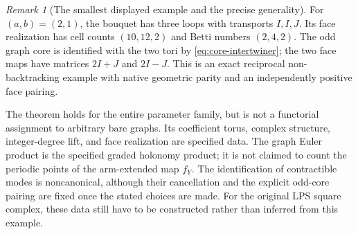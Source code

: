 \documentclass[11pt,a4paper]{article}
\theoremstyle{remark}\newtheorem{remark}[definition]{Remark}
\begin{document}
\begin{remark}[The smallest displayed example and the precise generality]
For $(a,b)=(2,1)$, the bouquet has three loops with transports $I,I,J$. Its face realization has cell counts $(10,12,2)$ and Betti numbers $(2,4,2)$. The odd graph core is identified with the two tori by \eqref{eq:core-intertwiner}; the two face maps have matrices $2I+J$ and $2I-J$. This is an exact reciprocal non-backtracking example with native geometric parity and an independently positive face pairing.

The theorem holds for the entire parameter family, but is not a functorial assignment to arbitrary bare graphs. Its coefficient torus, complex structure, integer-degree lift, and face realization are specified data. The graph Euler product is the specified graded holonomy product; it is not claimed to count the periodic points of the arm-extended map $f_Y$. The identification of contractible modes is noncanonical, although their cancellation and the explicit odd-core pairing are fixed once the stated choices are made. For the original LPS square complex, these data still have to be constructed rather than inferred from this example.
\end{remark}
\end{document}
